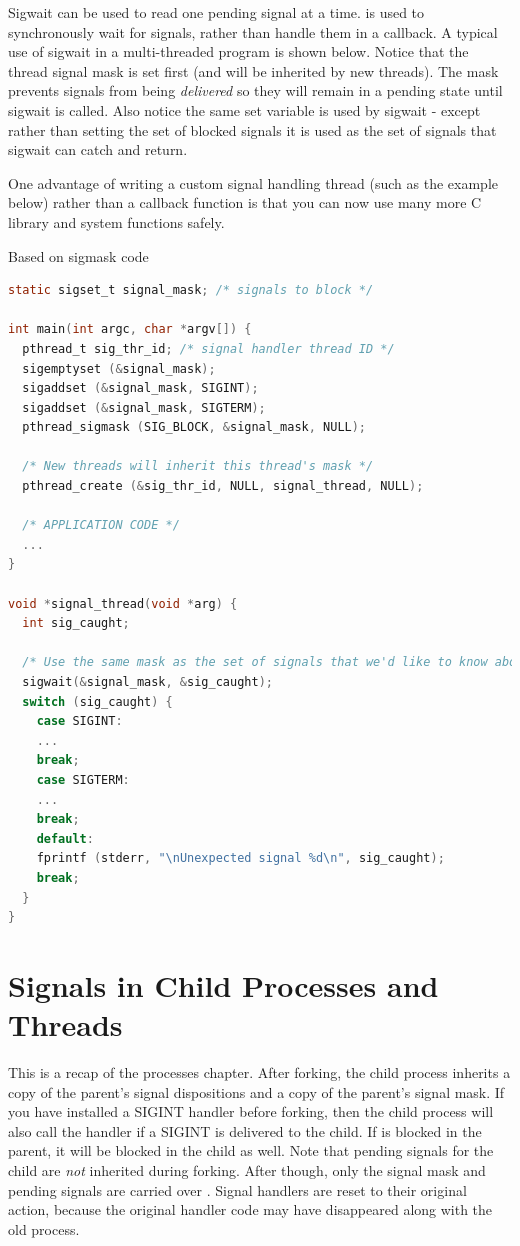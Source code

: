 Sigwait can be used to read one pending signal at a time.
 is used to synchronously wait for signals, rather than handle them in a callback.
A typical use of sigwait in a multi-threaded program is shown below.
Notice that the thread signal mask is set first (and will be inherited by new threads).
The mask prevents signals from being \emph{delivered} so they will remain in a pending state until sigwait is called.
Also notice the same set  variable is used by sigwait - except rather than setting the set of blocked signals it is used as the set of signals that sigwait can catch and return.

One advantage of writing a custom signal handling thread (such as the example below) rather than a callback function is that you can now use many more C library and system functions safely.

Based on sigmask code \cite{pthread_sigmask}

\begin{lstlisting}[language=C]
static sigset_t signal_mask; /* signals to block */

int main(int argc, char *argv[]) {
  pthread_t sig_thr_id; /* signal handler thread ID */
  sigemptyset (&signal_mask);
  sigaddset (&signal_mask, SIGINT);
  sigaddset (&signal_mask, SIGTERM);
  pthread_sigmask (SIG_BLOCK, &signal_mask, NULL);

  /* New threads will inherit this thread's mask */
  pthread_create (&sig_thr_id, NULL, signal_thread, NULL);

  /* APPLICATION CODE */
  ...
}

void *signal_thread(void *arg) {
  int sig_caught;

  /* Use the same mask as the set of signals that we'd like to know about! */
  sigwait(&signal_mask, &sig_caught);
  switch (sig_caught) {
    case SIGINT:
    ...
    break;
    case SIGTERM:
    ...
    break;
    default:
    fprintf (stderr, "\nUnexpected signal %d\n", sig_caught);
    break;
  }
}
\end{lstlisting}

\section{Signals in Child Processes and Threads}

This is a recap of the processes chapter.
After forking, the child process inherits a copy of the parent's signal dispositions and a copy of the parent's signal mask.
If you have installed a SIGINT handler before forking, then the child process will also call the handler if a SIGINT is delivered to the child.
If  is blocked in the parent, it will be blocked in the child as well.
Note that pending signals for the child are \emph{not} inherited during forking.
After  though, only the signal mask and pending signals are carried over \cite{execute}.
Signal handlers are reset to their original action, because the original handler code may have disappeared along with the old process.

